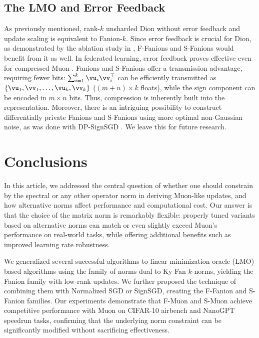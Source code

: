 \documentclass[smallextended,referee,envcountsect]{svjour3}
\begin{document}
 \subsection{The LMO and Error Feedback}
 
 As previously mentioned, rank-$k$ unsharded Dion without error feedback and update scaling is equivalent to Fanion-$k$. Since error feedback is crucial for Dion, as demonstrated by the ablation study in \citep{ahn2025dion}, F-Fanions and S-Fanions would benefit from it as well. In federated learning, error feedback proves effective even for compressed Muon \citep{gruntkowska2025efmuon}. Fanions and S-Fanions offer a transmission advantage, requiring fewer bits: $\sum_{i=1}^k \vu_i \vv_i^\top$ can be efficiently transmitted as $\{\vu_1, \vv_1, \dots, \vu_k, \vv_k\}$ ($(m+n)\times k$ floats), while the sign component can be encoded in $m \times n$ bits. Thus, compression is inherently built into the representation. Moreover, there is an intriguing possibility to construct differentially private Fanions and S-Fanions using more optimal non-Gaussian noise, as was done with DP-SignSGD \citep{jang2024dplogsign}. We leave this for future research.
 
 
 \section{Conclusions}

 In this article, we addressed the central question of whether one should constrain by the spectral or any other operator norm in deriving Muon-like updates, and how alternative norms affect performance and computational cost. Our answer is that the choice of the matrix norm is remarkably flexible: properly tuned variants based on alternative norms can match or even slightly exceed Muon's performance on real-world tasks, while offering additional benefits such as improved learning rate robustness.

 We generalized several successful algorithms to linear minimization oracle (LMO) based algorithms using the family of norms dual to Ky Fan $k$-norms, yielding the Fanion family with low-rank updates. We further proposed the technique of combining them with Normalized SGD or SignSGD, creating the F-Fanion and S-Fanion families. Our experiments demonstrate that F-Muon and S-Muon achieve competitive performance with Muon on CIFAR-10 airbench and NanoGPT speedrun tasks, confirming that the underlying norm constraint can be significantly modified without sacrificing effectiveness.
\end{document}
